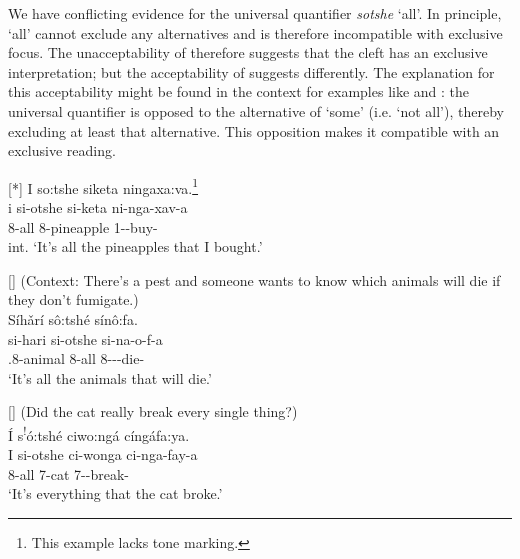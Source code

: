 \documentclass[output=paper]{langscibook}
\begin{document}
\z

We have conflicting evidence for the universal quantifier \textit{sotshe} ‘all’. In principle, ‘all’ cannot exclude any alternatives and is therefore incompatible with exclusive focus. The unacceptability of  therefore suggests that the cleft has an exclusive interpretation; but the acceptability of  suggests differently. The explanation for this acceptability might be found in the context for examples like  and : the universal quantifier is opposed to the alternative of ‘some’ (i.e. ‘not all’), thereby excluding at least that alternative. This opposition makes it compatible with an exclusive reading.

\ea
[*]{
\label{bkm:Ref120694808}
I so:tshe siketa ningaxa:va.\footnote{This example lacks tone marking.}\\
\gll
i  si-otshe  si-keta  ni-nga-xav-a\\
\COP{}  8-all  8-pineapple  1\SM{}-\REL{}-buy-\FV{}\\
\glt
int. ‘It’s all the pineapples that I bought.’\\
}

\z
\largerpage[-1]\pagebreak

\ea
[]{
\label{bkm:Ref120694822}
\label{bkm:Ref120694845}(Context: There’s a pest and someone wants to know which animals will die if they don’t fumigate.)\\
Síhǎrí sô:tshé sínô:fa.\\
\gll
si-hari  si-otshe  si-na-o-f-a\\
\COP{}.8-animal  8-all  8\SM{}-\FUT{}-\REL{}-die-\FV{}\\
\glt
‘It’s all the animals that will die.’\\
}

\z

\ea
[]{
\label{bkm:Ref120694861}
(Did the cat really break every single thing?)\\
Í s\textsuperscript{!}ó:tshé ciwo:ngá cíngáfa:ya.\\
\gll
I  si-otshe  ci-wonga  ci-nga-fay-a\\
\COP{}  8-all  7-cat  7\SM{}-\REL{}-break-\FV{}\\
\glt
‘It’s everything that the cat broke.’\\
}
\end{document}
